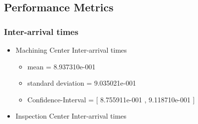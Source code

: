 \documentclass[aps,letterpaper,10pt]{revtex4}
\begin{document}
    \subsection{Performance Metrics}
        \subsubsection{Inter-arrival times}
            \begin{itemize}
                \item Machining Center Inter-arrival times
                    \begin{itemize}
                        \item mean = 8.937310e-001
                        \item standard deviation = 9.035021e-001
                        \item Confidence-Interval = [ 8.755911e-001 , 9.118710e-001 ]
                    \end{itemize}
                    \begin{figure}[htp]
                        \begin{center}
                        \end{center}
                    \end{figure}
                \item Inspection Center Inter-arrival times
                    \begin{itemize}

\end{itemize}
\end{itemize}
\end{document}
